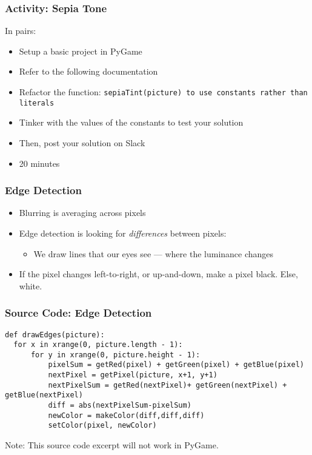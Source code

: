 \begin{frame}
	\frametitle{Activity: Sepia Tone}
	
	In pairs:
	
	\vspace{2em}
	
	\begin{itemize}		
		\item Setup a basic project in PyGame
		\item Refer to the following documentation
		\item Refactor the function: \texttt{sepiaTint(picture) to use constants rather than literals}
		\item Tinker with the values of the constants to test your solution
		\item Then, post your solution on Slack
		\item 20 minutes
	\end{itemize}
\end{frame}

\begin{frame}
	\frametitle{Edge Detection}
	
	\begin{itemize}		
		\item Blurring is averaging across pixels
		\item Edge detection is looking for \textit{differences} between pixels:
		\begin{itemize}
			\item We draw lines that our eyes see --- where the luminance changes
		\end{itemize}	
		\item If the pixel changes left-to-right, or up-and-down, make a pixel black. Else, white.
	\end{itemize}
\end{frame}

\begin{frame}[fragile]
	\frametitle{Source Code: Edge Detection}
	
\begin{lstlisting}
def drawEdges(picture):
  for x in xrange(0, picture.length - 1):
      for y in xrange(0, picture.height - 1):
          pixelSum = getRed(pixel) + getGreen(pixel) + getBlue(pixel)
          nextPixel = getPixel(picture, x+1, y+1)
          nextPixelSum = getRed(nextPixel)+ getGreen(nextPixel) + getBlue(nextPixel)
          diff = abs(nextPixelSum-pixelSum)
          newColor = makeColor(diff,diff,diff)
          setColor(pixel, newColor)
\end{lstlisting}

Note: This source code excerpt will not work in PyGame.

\end{frame}

